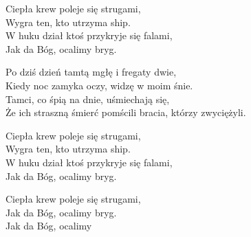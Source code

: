 \begin{text}
    \vin Ciepła krew poleje się strugami,\\
    \vin Wygra ten, kto utrzyma ship.\\
    \vin W huku dział ktoś przykryje się falami,\\
    \vin Jak da Bóg, ocalimy bryg.

    Po dziś dzień tamtą mgłę i fregaty dwie,\\
    Kiedy noc zamyka oczy, widzę w moim śnie.\\
    Tamci, co śpią na dnie, uśmiechają się,\\
    Że ich straszną śmierć pomścili bracia, którzy zwyciężyli.

    \vin Ciepła krew poleje się strugami,\\
    \vin Wygra ten, kto utrzyma ship.\\
    \vin W huku dział ktoś przykryje się falami,\\
    \vin Jak da Bóg, ocalimy bryg.

    Ciepła krew poleje się strugami,\\
    Jak da Bóg, ocalimy bryg.\\
    Jak da Bóg, ocalimy\\
   
   

\end{text}
